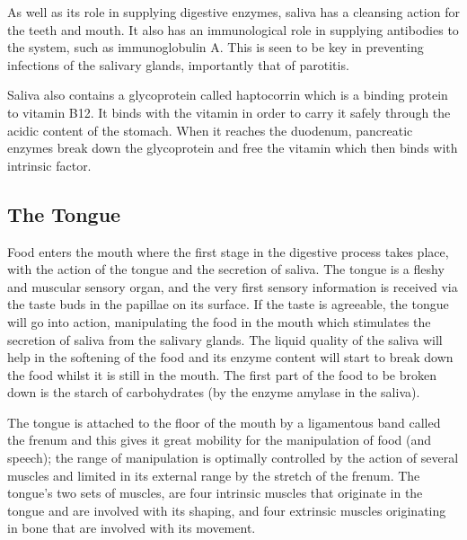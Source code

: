 As well as its role in supplying digestive enzymes, saliva has a cleansing action for the teeth and mouth. It also has an immunological role in supplying antibodies to the system, such as immunoglobulin A. This is seen to be key in preventing infections of the salivary glands, importantly that of parotitis.

Saliva also contains a glycoprotein called haptocorrin which is a binding protein to vitamin B12. It binds with the vitamin in order to carry it safely through the acidic content of the stomach. When it reaches the duodenum, pancreatic enzymes break down the glycoprotein and free the vitamin which then binds with intrinsic factor.

\hypertarget{the-tongue}{%
\subsection{The Tongue}\label{the-tongue}}

Food enters the mouth where the first stage in the digestive process takes place, with the action of the tongue and the secretion of saliva. The tongue is a fleshy and muscular sensory organ, and the very first sensory information is received via the taste buds in the papillae on its surface. If the taste is agreeable, the tongue will go into action, manipulating the food in the mouth which stimulates the secretion of saliva from the salivary glands. The liquid quality of the saliva will help in the softening of the food and its enzyme content will start to break down the food whilst it is still in the mouth. The first part of the food to be broken down is the starch of carbohydrates (by the enzyme amylase in the saliva).

The tongue is attached to the floor of the mouth by a ligamentous band called the frenum and this gives it great mobility for the manipulation of food (and speech); the range of manipulation is optimally controlled by the action of several muscles and limited in its external range by the stretch of the frenum. The tongue's two sets of muscles, are four intrinsic muscles that originate in the tongue and are involved with its shaping, and four extrinsic muscles originating in bone that are involved with its movement.

